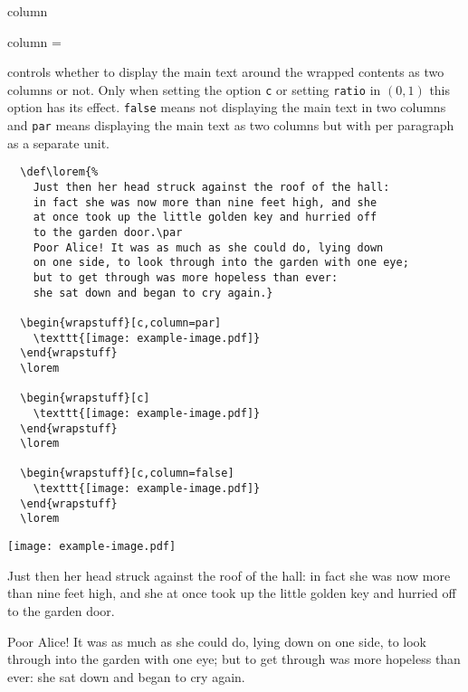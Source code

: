 \documentclass{l3doc}
\newcommand{\opt}[1]{\texttt{#1}}
\begin{document}
\begin{function}{column}
  \begin{syntax}
    column = 
  \end{syntax}
  controls whether to display the main text around the wrapped contents
  as two columns or not. Only when setting the option \opt{c}
  or setting \opt{ratio} in $(0,1)$ this option has its effect.
  \opt{false} means not displaying the main text in two columns
  and \opt{par} means displaying the main text as two columns
  but with per paragraph as a separate unit.
\end{function}

\begin{verbatim}
  \def\lorem{%
    Just then her head struck against the roof of the hall:
    in fact she was now more than nine feet high, and she
    at once took up the little golden key and hurried off
    to the garden door.\par
    Poor Alice! It was as much as she could do, lying down
    on one side, to look through into the garden with one eye;
    but to get through was more hopeless than ever: 
    she sat down and began to cry again.}
  
  \begin{wrapstuff}[c,column=par]
    \texttt{[image: example-image.pdf]}
  \end{wrapstuff}
  \lorem
  
  \begin{wrapstuff}[c]
    \texttt{[image: example-image.pdf]}
  \end{wrapstuff}
  \lorem
  
  \begin{wrapstuff}[c,column=false]
    \texttt{[image: example-image.pdf]}
  \end{wrapstuff}
  \lorem
\end{verbatim}

\def\lorem{%
Just then her head struck against the roof of the hall: in fact she was now more than nine feet high, and she at once took up the little golden key and hurried off to the garden door.\par
Poor Alice! It was as much as she could do, lying down on one side, to look through into the garden with one eye; but to get through was more hopeless than ever: she sat down and began to cry again.}
\begin{wrapstuff}[c,column=par]
  \texttt{[image: example-image.pdf]}
\end{wrapstuff}
\lorem
\end{document}
